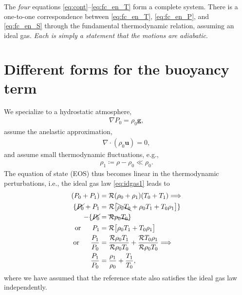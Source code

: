 \documentclass[12pt]{article} %
\begin{document}
	The \textit{four} equations \eqref{eq:cont}--\eqref{eq:fc_en_T} form a complete system. There is a one-to-one correspondence between  \eqref{eq:fc_en_T},  \eqref{eq:fc_en_P}, and \eqref{eq:fc_en_S} through the fundamental thermodynamic relation, assuming an ideal gas. \textit{Each is simply a statement that the motions are adiabatic}.
	
	\section{Different forms for the buoyancy term}
	We specialize to a hydrostatic atmosphere,
	\begin{align}
	\nabla P_0 = \rho_0\bm{g},
	\label{eq:hydr}
	\end{align}
	assume the anelastic approximation,
	\begin{align}\label{eq:ans_cont}
	\nabla\cdot(\rho_0\bm{u})=0,
	\end{align}
	and assume small thermodynamic fluctuations, e.g.,
	\begin{align}
	\rho_1\coloneqq\rho - \rho_0 \ll \rho_0.
	\end{align}
	The equation of state (EOS) thus becomes linear in the thermodynamic perturbations, i.e., the ideal gas law \eqref{eq:idgas1} leads to 
	\begin{align*}
	(P_0 + P_1) &= \mathcal{R}(\rho_0 + \rho_1)(T_0+T_1)\Longrightarrow\\
	\{\cancel{P_0} + P_1 &= \mathcal{R}\big{[}\bcancel{\rho_0T_0}+ \rho_0T_1 + T_0\rho_1\big{]}\}\\
	-\{\cancel{P_0} &= \bcancel{\mathcal{R}\rho_0T_0}\}\\
	\text{or}\ \ \ \ \ P_1 &= \mathcal{R}\big{[}\rho_0T_1 +T_0 \rho_1\big{]}\\
	\text{or}\ \ \ \ \ \frac{P_1}{P_0} &= \frac{\mathcal{R}\rho_0T_1}{\mathcal{R}\rho_0T_0} + \frac{\mathcal{R}T_0\rho_1}{\mathcal{R}\rho_0T_0} \Longrightarrow\\ \frac{P_1}{P_0}&= \frac{\rho_1}{\rho_0} + \frac{T_1}{T_0},
	\end{align*} where we have assumed that the reference state also satisfies the ideal gas law independently. 
	
\end{document}
